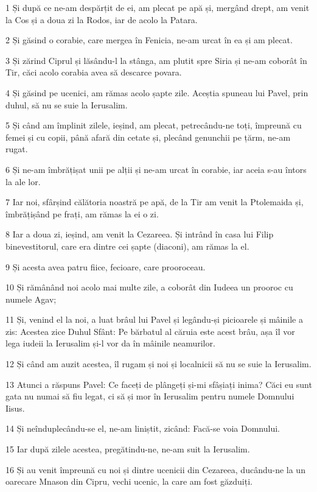 \par 1 Și după ce ne-am despărțit de ei, am plecat pe apă și, mergând drept, am venit la Cos și a doua zi la Rodos, iar de acolo la Patara.
\par 2 Și găsind o corabie, care mergea în Fenicia, ne-am urcat în ea și am plecat.
\par 3 Și zărind Ciprul și lăsându-l la stânga, am plutit spre Siria și ne-am coborât în Tir, căci acolo corabia avea să descarce povara.
\par 4 Și găsind pe ucenici, am rămas acolo șapte zile. Aceștia spuneau lui Pavel, prin duhul, să nu se suie la Ierusalim.
\par 5 Și când am împlinit zilele, ieșind, am plecat, petrecându-ne toți, împreună cu femei și cu copii, până afară din cetate și, plecând genunchii pe țărm, ne-am rugat.
\par 6 Și ne-am îmbrățișat unii pe alții și ne-am urcat în corabie, iar aceia s-au întors la ale lor.
\par 7 Iar noi, sfârșind călătoria noastră pe apă, de la Tir am venit la Ptolemaida și, îmbrățișând pe frați, am rămas la ei o zi.
\par 8 Iar a doua zi, ieșind, am venit la Cezareea. Și intrând în casa lui Filip binevestitorul, care era dintre cei șapte (diaconi), am rămas la el.
\par 9 Și acesta avea patru fiice, fecioare, care prooroceau.
\par 10 Și rămânând noi acolo mai multe zile, a coborât din Iudeea un prooroc cu numele Agav;
\par 11 Și, venind el la noi, a luat brâul lui Pavel și legându-și picioarele și mâinile a zis: Acestea zice Duhul Sfânt: Pe bărbatul al căruia este acest brâu, așa îl vor lega iudeii la Ierusalim și-l vor da în mâinile neamurilor.
\par 12 Și când am auzit acestea, îl rugam și noi și localnicii să nu se suie la Ierusalim.
\par 13 Atunci a răspuns Pavel: Ce faceți de plângeți și-mi sfâșiați inima? Căci eu sunt gata nu numai să fiu legat, ci să și mor în Ierusalim pentru numele Domnului Iisus.
\par 14 Și neînduplecându-se el, ne-am liniștit, zicând: Facă-se voia Domnului.
\par 15 Iar după zilele acestea, pregătindu-ne, ne-am suit la Ierusalim.
\par 16 Și au venit împreună cu noi și dintre ucenicii din Cezareea, ducându-ne la un oarecare Mnason din Cipru, vechi ucenic, la care am fost găzduiți.
